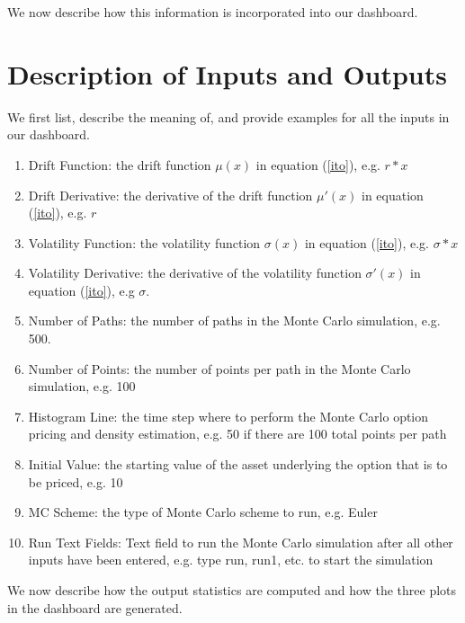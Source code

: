 \documentclass{amsart}
\begin{document}
We now describe how this information is incorporated into our dashboard.

\section{Description of Inputs and Outputs}

We first list, describe the meaning of, and provide examples for all the inputs in our dashboard. 

\begin{enumerate}
    \item Drift Function: the drift function $\mu(x)$ in equation (\ref{ito}), e.g. $r*x$   
    \item Drift Derivative: the derivative of the drift function $\mu'(x)$ in equation (\ref{ito}), e.g. $r$  
    \item Volatility Function: the volatility function $\sigma(x)$ in equation (\ref{ito}), e.g. $\sigma*x$
    \item Volatility Derivative: the derivative of the volatility function $\sigma'(x)$ in equation (\ref{ito}), e.g $\sigma$. 
    \item Number of Paths: the number of paths in the Monte Carlo simulation, e.g. 500. 
    \item Number of Points: the number of points per path in the Monte Carlo simulation, e.g. 100 
    \item Histogram Line: the time step where to perform the Monte Carlo option pricing and
          density estimation, e.g. 50 if there are 100 total points per path 
    \item Initial Value: the starting value of the asset underlying the option that is to be priced, e.g. 10
    \item MC Scheme: the type of Monte Carlo scheme to run, e.g. Euler 
    \item Run Text Fields: Text field to run the Monte Carlo simulation after all other inputs have 
          been entered, e.g. type run, run1, etc. to start the simulation
\end{enumerate}

We now describe how the output statistics are computed and how the three plots in the 
dashboard are generated. 
\end{document}
